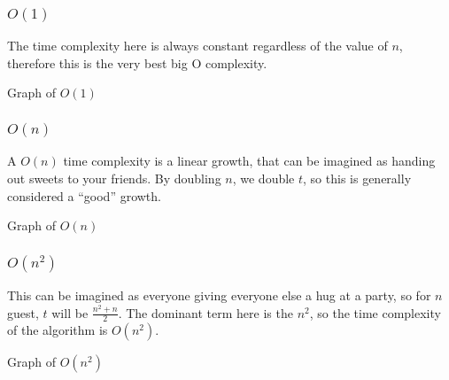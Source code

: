 \subsubsection{\(O(1)\)}\label{ssub:mkoone}

The time complexity here is always constant regardless of the value of \(n\), therefore this is the very best big O complexity.
\begin{highlight}{Graph of \(O(1)\)}
\end{highlight}

\subsubsection{\(O(n)\)}\label{ssub:mkon}

A \(O(n)\) time complexity is a linear growth, that can be imagined as handing out sweets to your friends.
By doubling \(n\), we double \(t\), so this is generally considered a ``good'' growth.
\begin{highlight}{Graph of \(O(n)\)}
\end{highlight}

\subsubsection{\(O(n^2)\)}\label{ssub:mkonsr}

This can be imagined as everyone giving everyone else a hug at a party, so for \(n\) guest, \(t\) will be \(\frac{n^2+n}{2}\).
The dominant term here is the \(n^2\), so the time complexity of the algorithm is \(O(n^2)\).

\begin{highlight}{Graph of \(O(n^2)\)}
\end{highlight}

